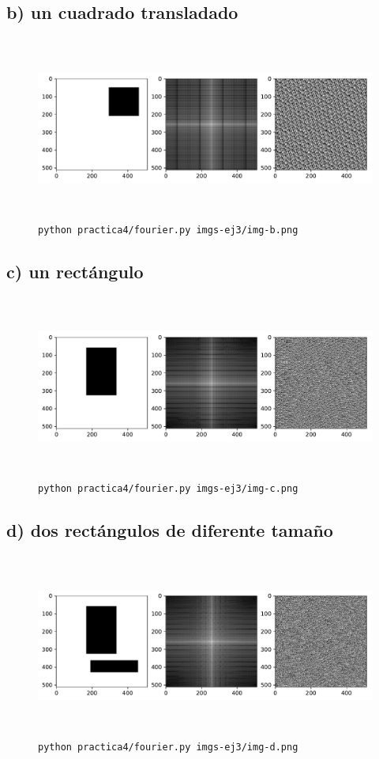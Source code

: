 \documentclass[11pt, spanish]{article}
\begin{document}
\subsection{b) un cuadrado transladado}
\begin{figure}[H]
\centering
  \includegraphics[height=6cm]{informe-imgs/ej3-b.pdf}
  \caption{\texttt{python practica4/fourier.py imgs-ej3/img-b.png}}
\end{figure}

\subsection{c) un rectángulo}
\begin{figure}[H]
\centering
  \includegraphics[height=6cm]{informe-imgs/ej3-c.pdf}
  \caption{\texttt{python practica4/fourier.py imgs-ej3/img-c.png}}
\end{figure}

\subsection{d) dos rectángulos de diferente tamaño}
\begin{figure}[H]
\centering
  \includegraphics[height=6cm]{informe-imgs/ej3-d.pdf}
  \caption{\texttt{python practica4/fourier.py imgs-ej3/img-d.png}}
\end{figure}
\end{document}
